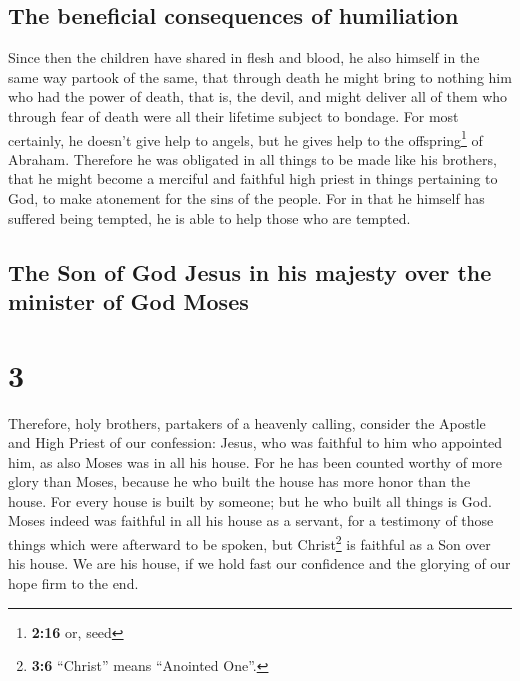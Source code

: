 \hypertarget{the-beneficial-consequences-of-humiliation}{%
\subsection{The beneficial consequences of
humiliation}\label{the-beneficial-consequences-of-humiliation}}

 Since then the children have shared in flesh and blood,
he also himself in the same way partook of the same, that through death
he might bring to nothing him who had the power of death, that is, the
devil,  and might deliver all of them who through fear of
death were all their lifetime subject to bondage.  For
most certainly, he doesn't give help to angels, but he gives help to the
offspring\footnote{\textbf{2:16} or, seed} of Abraham. 
Therefore he was obligated in all things to be made like his brothers,
that he might become a merciful and faithful high priest in things
pertaining to God, to make atonement for the sins of the people.
 For in that he himself has suffered being tempted, he is
able to help those who are tempted.

\hypertarget{the-son-of-god-jesus-in-his-majesty-over-the-minister-of-god-moses}{%
\subsection{The Son of God Jesus in his majesty over the minister of God
Moses}\label{the-son-of-god-jesus-in-his-majesty-over-the-minister-of-god-moses}}

\hypertarget{section-2}{%
\section{3}\label{section-2}}

 Therefore, holy brothers, partakers of a heavenly
calling, consider the Apostle and High Priest of our confession: Jesus,
 who was faithful to him who appointed him, as also Moses
was in all his house.  For he has been counted worthy of
more glory than Moses, because he who built the house has more honor
than the house.  For every house is built by someone; but
he who built all things is God.  Moses indeed was faithful
in all his house as a servant, for a testimony of those things which
were afterward to be spoken,  but Christ\footnote{\textbf{3:6}
  ``Christ'' means ``Anointed One''.} is faithful as a Son over his
house. We are his house, if we hold fast our confidence and the glorying
of our hope firm to the end.

